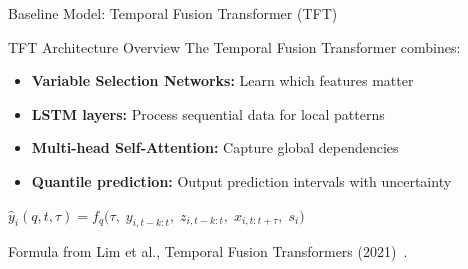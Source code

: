 \documentclass[aspectratio=169,xcolor=dvipsnames]{beamer}
\begin{document}
\begin{frame}{Baseline Model: Temporal Fusion Transformer (TFT)}
    \begin{block}{TFT Architecture Overview}
        The Temporal Fusion Transformer combines:
        \begin{itemize}
            \item \textbf{Variable Selection Networks:} Learn which features matter
            \item \textbf{LSTM layers:} Process sequential data for local patterns
            \item \textbf{Multi-head Self-Attention:} Capture global dependencies
            \item \textbf{Quantile prediction:} Output prediction intervals with uncertainty
        \end{itemize}
    \end{block}
    
 
\begin{center}
\Large
$\hat{y}_i(q, t, \tau) 
    = f_q\Big( \tau,\;
     {y_{i,t-k:t}},\;
     {z_{i,t-k:t}},\;
     {x_{i,t:t+\tau}},\;
      {s_i}
    \Big)$
\end{center}
\begin{center}

\footnotesize
Formula from Lim et al., Temporal Fusion Transformers (2021)~\cite{lim2021temporal}.
\end{center}
\end{frame}
\end{document}
